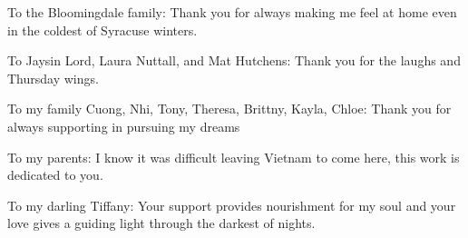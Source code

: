 \documentclass[oneside,12pt]{book}
\begin{document}
To the Bloomingdale family: Thank you for always making me feel at home even in the coldest of Syracuse winters.

To Jaysin Lord, Laura Nuttall, and Mat Hutchens: Thank you for the laughs and Thursday wings.

To my family Cuong, Nhi, Tony, Theresa, Brittny, Kayla, Chloe: Thank you for always supporting in pursuing my dreams

To my parents: I know it was difficult leaving Vietnam to come here, this work is dedicated to you.

To my darling Tiffany: Your support provides nourishment for my soul and your love gives a guiding light through the darkest of nights.


\tableofcontents


	









\listoffigures
\listoftables

\medskip





	
\end{document}
